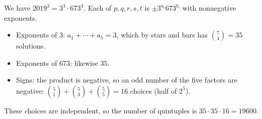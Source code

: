 We have $2019^3=3^3\cdot673^3$. Each of $p,q,r,s,t$ is $\pm3^{a_i}673^{b_i}$ with nonnegative exponents.
\begin{itemize}
\item Exponents of $3$: $a_1+\cdots+a_5=3$, which by stars and bars has $\binom{7}{4}=35$ solutions.
\item Exponents of $673$: likewise $35$.
\item Signs: the product is negative, so an odd number of the five factors are negative: $\binom51+\binom53+\binom55=16$ choices (half of $2^5$).
\end{itemize}
These choices are independent, so the number of quintuples is $35\cdot35\cdot16=\boxed{19600}$.
